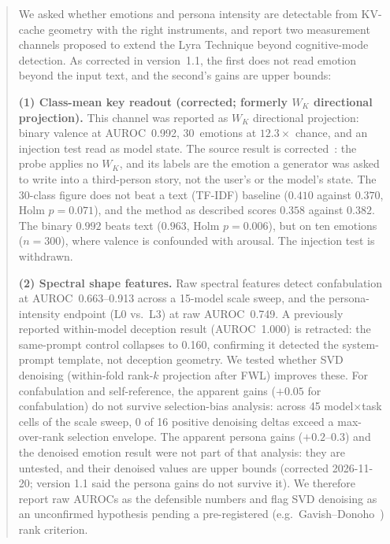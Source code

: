 \documentclass[11pt,a4paper]{article}
\begin{document}
\begin{abstract}

We asked whether emotions and persona intensity are detectable from KV-cache
geometry with the right instruments, and report two measurement channels
proposed to extend the Lyra Technique beyond cognitive-mode detection. As
corrected in version~1.1, the first does not read emotion beyond the input
text, and the second's gains are upper bounds:

\textbf{(1) Class-mean key readout (corrected; formerly $W_K$ directional
projection).} This channel was reported as $W_K$ directional projection:
binary valence at AUROC~0.992, 30~emotions at $12.3\times$ chance, and an
injection test read as model state. The source result is
corrected~\citep{lyra_p4}: the probe applies no $W_K$, and its labels are
the emotion a generator was asked to write into a third-person story, not the
user's or the model's state. The 30-class figure does not beat a text
(TF-IDF) baseline ($0.410$ against $0.370$, Holm $p = 0.071$), and the method
as described scores $0.358$ against $0.382$. The binary $0.992$ beats text
($0.963$, Holm $p = 0.006$), but on ten emotions ($n = 300$), where valence
is confounded with arousal. The injection test is withdrawn.

\textbf{(2) Spectral shape features.} Raw spectral features detect
confabulation at AUROC~0.663--0.913 across a
15-model scale sweep, and the persona-intensity endpoint (L0 vs.\ L3) at raw
AUROC~0.749. A previously reported within-model deception result
(AUROC~1.000) is retracted: the same-prompt control collapses to 0.160,
confirming it detected the system-prompt template, not deception geometry. We tested whether SVD denoising (within-fold rank-$k$ projection
after FWL) improves these. For confabulation and self-reference, the
apparent gains ($+0.05$ for confabulation) do not survive selection-bias
analysis: across 45 model$\times$task cells of the scale sweep, 0 of 16
positive denoising deltas exceed a max-over-rank selection envelope. The
apparent persona gains ($+0.2$--$0.3$) and the denoised emotion result were
not part of that analysis: they are untested, and their denoised values are
upper bounds (corrected 2026-11-20; version 1.1 said the persona gains do not
survive it). We therefore report raw AUROCs as
the defensible numbers and flag SVD denoising as an unconfirmed hypothesis
pending a pre-registered (e.g.\ Gavish--Donoho~\citep{gavish2014optimal}) rank criterion.


\end{abstract}
\end{document}
